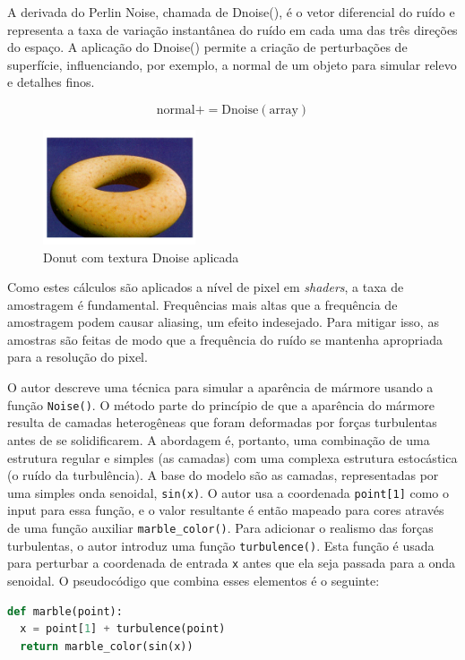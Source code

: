 A derivada do Perlin Noise, chamada de Dnoise(), é o vetor diferencial do ruído e representa a taxa de variação instantânea do ruído em cada uma das três direções do espaço. A aplicação do Dnoise() permite a criação de perturbações de superfície, influenciando, por exemplo, a normal de um objeto para simular relevo e detalhes finos.

$$
\text{normal} += \text{Dnoise}(\text{array})
$$

\begin{figure}[H]
    \centering
    \includegraphics[width=0.4\textwidth]{img/donut4.png}
    \caption{Donut com textura Dnoise aplicada}
    \label{fig:donut_dnoise}
\end{figure}

Como estes cálculos são aplicados a nível de pixel em \textit{shaders}, a taxa de amostragem é fundamental. Frequências mais altas que a frequência de amostragem podem causar aliasing, um efeito indesejado. Para mitigar isso, as amostras são feitas de modo que a frequência do ruído se mantenha apropriada para a resolução do pixel.

O autor descreve uma técnica para simular a aparência de mármore usando a função \texttt{Noise()}. O método parte do princípio de que a aparência do mármore resulta de camadas heterogêneas que foram deformadas por forças turbulentas antes de se solidificarem. A abordagem é, portanto, uma combinação de uma estrutura regular e simples (as camadas) com uma complexa estrutura estocástica (o ruído da turbulência). A base do modelo são as camadas, representadas por uma simples onda senoidal, \texttt{sin(x)}. O autor usa a coordenada \texttt{point[1]} como o input para essa função, e o valor resultante é então mapeado para cores através de uma função auxiliar \texttt{marble\_color()}. Para adicionar o realismo das forças turbulentas, o autor introduz uma função \texttt{turbulence()}. Esta função é usada para perturbar a coordenada de entrada \texttt{x} antes que ela seja passada para a onda senoidal. O pseudocódigo que combina esses elementos é o seguinte:

\begin{lstlisting}[language=Python, caption={Pseudocódigo da função marble()}]
def marble(point):
  x = point[1] + turbulence(point)
  return marble_color(sin(x))
\end{lstlisting}

